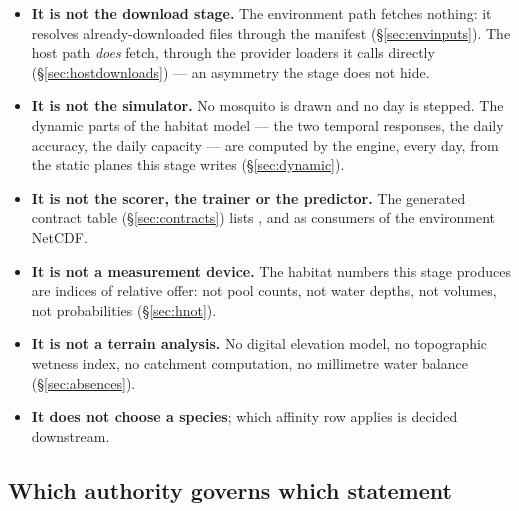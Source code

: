 \documentclass[11pt,a4paper]{article} \usepackage[utf8]{inputenc} \usepackage{lmodern} \usepackage[T1]{fontenc}
\begin{document}
\begin{itemize}
\item \textbf{It is not the download stage.} The environment path fetches nothing: it resolves
already-downloaded files through the manifest (\S\ref{sec:envinputs}). The host
path \emph{does} fetch, through the provider loaders it calls directly
(\S\ref{sec:hostdownloads}) --- an asymmetry the stage does not hide. 
\item \textbf{It is not
the simulator.} No mosquito is drawn and no day is stepped. The dynamic parts of the habitat
model --- the two temporal responses, the daily accuracy, the daily capacity --- are computed by
the engine, every day, from the static planes this stage writes (\S\ref{sec:dynamic}). 
\item
\textbf{It is not the scorer, the trainer or the predictor.} The generated contract table
(\S\ref{sec:contracts}) lists ,  and  as consumers of
the environment NetCDF. 
\item \textbf{It is not a measurement device.} The habitat numbers this
stage produces are indices of relative offer: not pool counts, not water depths, not volumes,
not probabilities (\S\ref{sec:hnot}). 
\item \textbf{It is not a terrain analysis.} No digital
elevation model, no topographic wetness index, no catchment computation, no millimetre water
balance (\S\ref{sec:absences}). 
\item \textbf{It does not choose a species}; which affinity row
applies is decided downstream.
\end{itemize}

\subsection{Which authority governs which statement} \label{sec:authority}
\end{document}
